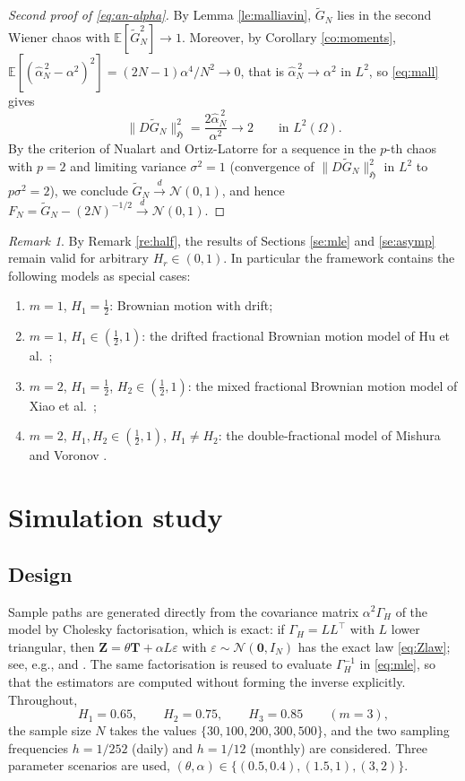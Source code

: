 \documentclass[11pt,reqno]{amsart}
\numberwithin{equation}{section}
\theoremstyle{plain}
\theoremstyle{definition}
\theoremstyle{remark}
\newtheorem{remark}[theorem]{Remark}
\newcommand{\bT}{\mathbf{T}}
\newcommand{\bZ}{\mathbf{Z}}
\newcommand{\bze}{\mathbf{0}}
\newcommand{\GH}{\Gamma_H}
\newcommand{\E}{\mathbb{E}}
\newcommand{\Norm}{\mathcal{N}}
\newcommand{\Hi}{\mathfrak{H}}
\begin{document}
\begin{proof}[Second proof of \eqref{eq:an-alpha}]
By Lemma \ref{le:malliavin}, $\widetilde G_N$ lies in the second Wiener chaos with
$\E[\widetilde G_N^{2}]\to1$. Moreover, by Corollary \ref{co:moments},
$\E[(\widehat\alpha^{\,2}_N-\alpha^{2})^{2}]=(2N-1)\alpha^{4}/N^{2}\to0$, that is
$\widehat\alpha^{\,2}_N\to\alpha^{2}$ in $L^{2}$, so \eqref{eq:mall} gives
\[
  \bigl\|D\widetilde G_N\bigr\|^{2}_{\Hi}
  =\frac{2\widehat\alpha^{\,2}_N}{\alpha^{2}}\longrightarrow2
  \qquad\text{in }L^{2}(\Omega).
\]
By the criterion of Nualart and Ortiz-Latorre \cite[Thm.~4]{NOL08} for a sequence in the
$p$-th chaos with $p=2$ and limiting variance $\sigma^{2}=1$ (convergence of
$\|D\widetilde G_N\|^{2}_{\Hi}$ in $L^{2}$ to $p\sigma^{2}=2$), we conclude
$\widetilde G_N\xrightarrow{d}\Norm(0,1)$, and hence
$F_N=\widetilde G_N-(2N)^{-1/2}\xrightarrow{d}\Norm(0,1)$.
\end{proof}

\begin{remark}\label{re:special}
By Remark \ref{re:half}, the results of Sections \ref{se:mle} and \ref{se:asymp}
remain valid for arbitrary $H_r\in(0,1)$. In particular the framework contains the
following models as special cases:
\begin{enumerate}[label=\textup{(\alph*)}]
\item $m=1$, $H_1=\frac12$: Brownian motion with drift;
\item $m=1$, $H_1\in(\frac12,1)$: the drifted fractional Brownian motion model of
      Hu et al.\ \cite{HNXZ11};
\item $m=2$, $H_1=\frac12$, $H_2\in(\frac12,1)$: the mixed fractional Brownian motion
      model of Xiao et al.\ \cite{XZZ11};
\item $m=2$, $H_1,H_2\in(\frac12,1)$, $H_1\ne H_2$: the double-fractional model of
      Mishura and Voronov \cite{MV15}.
\end{enumerate}
\end{remark}

\section{Simulation study}\label{se:sim}

\subsection{Design}
Sample paths are generated directly from the covariance matrix $\alpha^{2}\GH$ of the
model by Cholesky factorisation, which is exact: if $\GH=LL^{\top}$ with $L$ lower
triangular, then $\bZ=\theta\bT+\alpha L\varepsilon$ with
$\varepsilon\sim\Norm(\bze,I_N)$ has the exact law \eqref{eq:Zlaw}; see, e.g.,
\cite[Ch.~XI]{AG07} and \cite{Hig01}. The same factorisation is reused to evaluate
$\GH^{-1}$ in \eqref{eq:mle}, so that the estimators are computed without forming the
inverse explicitly. Throughout,
\[
  H_1=0.65,\qquad H_2=0.75,\qquad H_3=0.85\qquad(m=3),
\]
the sample size $N$ takes the values $\{30,100,200,300,500\}$, and the two sampling
frequencies $h=1/252$ (daily) and $h=1/12$ (monthly) are considered. Three parameter
scenarios are used, $(\theta,\alpha)\in\{(0.5,0.4),(1.5,1),(3,2)\}$.
\end{document}
